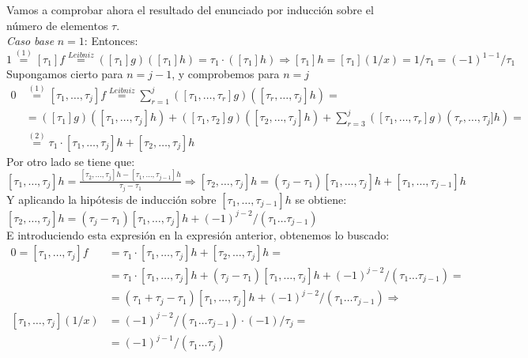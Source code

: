 \documentclass[12pt,a4paper]{article}
\begin{document}
Vamos a comprobar ahora el resultado del enunciado por inducción sobre el
número de elementos $\tau$.\\
\textit{Caso base} $n=1$: Entonces:
$$ 1 \stackrel{(1)}{=} [\tau_1]f \stackrel{Leibniz}{=} ([\tau_1]g)([\tau_1]h) = \tau_1 \cdot
([\tau_1]h) \Longrightarrow [\tau_1]h=[\tau_1](1/x) = 1/\tau_1 =
(-1)^{1-1}/\tau_1$$
Supongamos cierto para $n=j-1$, y comprobemos para $n=j$
\begin{align*}
  0&\stackrel{(1)}{=}[\tau_{1},\dots,\tau_{j}]f\stackrel{Leibniz}{=}\sum\limits^{j}_{r=1}([\tau_1,\dots,\tau_r]g)([\tau_r,\dots,\tau_j]h)=\\
   &=([\tau_1]g)([\tau_1,\dots,\tau_j]h) +
     ([\tau_1,\tau_2]g)([\tau_2,\dots,\tau_j]h) +
     \sum\limits^{j}_{r=3}([\tau_1,\dots,\tau_r]g)(\tau_r,\dots,\tau_j]h)=\\
   &\stackrel{(2)}{=} \tau_1\cdot[\tau_1,\dots,\tau_j]h + [\tau_2,\dots,\tau_j]h 
\end{align*}
Por otro lado se tiene que:\\
$[\tau_1,\dots,\tau_j]h = \frac{[\tau_2,\dots,\tau_j]h -
  [\tau_1,\dots,\tau_{j-1}]h}{\tau_j-\tau_1} \Longrightarrow
[\tau_2,\dots,\tau_j]h = (\tau_j-\tau_1)[\tau_{1},\dots,\tau_{j}]h +
[\tau_1,\dots,\tau_{j-1}]h$\\
Y aplicando la hipótesis de inducción sobre $[\tau_1,\dots,\tau_{j-1}]h$ se
obtiene:\\
$[\tau_2,\dots,\tau_j]h = (\tau_j-\tau_1)[\tau_1,\dots,\tau_j]h +
(-1)^{j-2}/(\tau_1\dots\tau_{j-1})$\\
E introduciendo esta expresión en la expresión anterior, obtenemos lo
buscado:
\begin{align*}
  0 = [\tau_1,\dots,\tau_j]f&=\tau_1\cdot[\tau_1,\dots,\tau_j]h +
                              [\tau_2,\dots,\tau_j]h=\\
                            &=\tau_1\cdot[\tau_1,\dots,\tau_j]h + (\tau_j-\tau_1)[\tau_1,\dots,\tau_j]h +
(-1)^{j-2}/(\tau_1\dots\tau_{j-1}) =\\
  &=(\tau_1+\tau_j-\tau_1)[\tau_1,\dots,\tau_j]h +
    (-1)^{j-2}/(\tau_1\dots\tau_{j-1}) \Longrightarrow\\
[\tau_1,\dots,\tau_j](1/x) &= (-1)^{j-2}/(\tau_1\dots\tau_{j-1}) \cdot
                             (-1)/\tau_j=\\
                             &=(-1)^{j-1}/(\tau_1\dots\tau_{j})
\end{align*}
\end{document}
